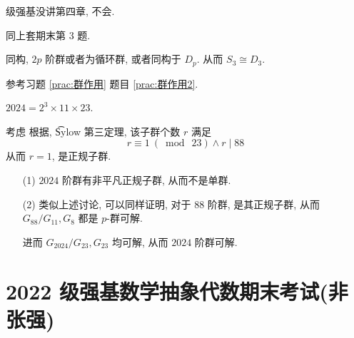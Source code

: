  级强基没讲第四章, 不会.

\problem[题目 5] 同上套期末第 3 题. 

\problem[题目 6]

\begin{solution}
	同构, $2p$ 阶群或者为循环群, 或者同构于 $D_p$. 从而 $S_3\cong D_3$.
\end{solution}

\problem[题目 7] 参考习题 \ref{prac:群作用} 题目 \ref{prac:群作用2}.

\problem[题目 8]

\begin{solution}
	$2024=2^3\times11\times23$.

	考虑 \Sy[23] 根据, \t{Sylow} 第三定理, 该子群个数 $r$ 满足 $$r\equiv 1\ (\bmod\ 23)\wedge r\mid 88$$ 从而 $r=1$, \Sy[23] 是正规子群.

	\begin{itemize}
		\item[(1)] $2024$ 阶群有非平凡正规子群, 从而不是单群.
		\item[(2)] 类似上述讨论, 可以同样证明, 对于 $88$ 阶群, \Sy[11] 是其正规子群, 从而 $G_{88}/G_{11},G_{8}$ 都是 $p$-群可解.

		进而 $G_{2024}/G_{23},G_{23}$ 均可解, 从而 $2024$ 阶群可解.

	\end{itemize}
\end{solution}
\newpage
\section{2022 级强基数学抽象代数期末考试(非张强)}